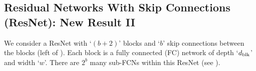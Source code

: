 \subsection{Residual Networks With Skip Connections (ResNet): New Result II}
We consider a ResNet with `$(b+2)$' blocks and `$b$' skip connections between the blocks (left of ). Each block is a fully connected (FC) network of depth `$d_{\text{blk}}$' and width `$w$'. There are $2^b$ many sub-FCNs within this ResNet (see ).%

